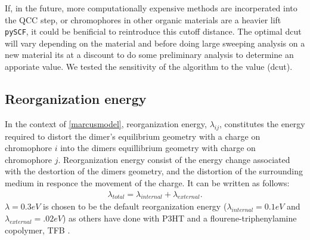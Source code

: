 If, in the future, more computationally expensive methods are incorperated into the QCC step, or chromophores in other
organic materials are a heavier lift \texttt{pySCF}, it could be benificial to reintroduce this cutoff distance. The optimal dcut will vary depending on the material and before doing large sweeping analysis on a new
material its at a discount to do some preliminary analysis to determine an apporiate value. We tested the
sensitivity of the algorithm to the value (dcut). 

\subsection{Reorganization energy}

In the context of \autoref{marcusmodel}, 
reorganization energy, $\lambda_{ij}$, constitutes the energy required to distort the dimer's equilibrium geometry with a
charge on chromophore $i$ into the dimers equillibrium geometry with charge on chromophore $j$.
Reorganization energy consist of the energy change associated with the destortion of the dimers geometry,
and the distortion of the surrounding medium in responce the movement of the charge. It can be written as
follows:
\begin{align}
    \lambda_{total} = \lambda_{internal} + \lambda_{external}.
\end{align} 
$\lambda = 0.3eV$ is chosen to be the default reorganization energy ($\lambda_{internal} = 0.1eV$
and $\lambda_{external} = .02eV$) as others have done with P3HT \cite{jones2017} and
a flourene-triphenylamine copolymer, TFB \cite{Gali2017}. 


